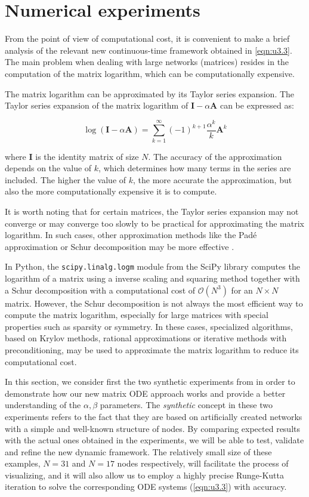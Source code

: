 \chapter{Numerical experiments}
\label{chap:expe}

From the point of view of computational cost, it is convenient to make a brief analysis of the relevant new continuous-time framework obtained in \eqref{eqn:u3.3}. The main problem when dealing with large networks (matrices) resides in the computation of the matrix logarithm, which can be computationally expensive.

The matrix logarithm can be approximated by its Taylor series expansion. The Taylor series expansion of the matrix logarithm of $\mathbf{I} - \alpha \mathbf{A}$ can be expressed as:

$$\log(\mathbf{I} - \alpha \mathbf{A}) = \sum_{k=1}^{\infty} (-1)^{k+1}\frac{\alpha^k}{k}\mathbf{A}^k$$

where $\mathbf{I}$ is the identity matrix of size $N$. The accuracy of the approximation depends on the value of $k$, which determines how many terms in the series are included. The higher the value of $k$, the more accurate the approximation, but also the more computationally expensive it is to compute.

It is worth noting that for certain matrices, the Taylor series expansion may not converge or may converge too slowly to be practical for approximating the matrix logarithm. In such cases, other approximation methods like the Padé approximation or Schur decomposition may be more effective \cite[Ch.\ 11]{higham2008functions}.

In Python, the \texttt{scipy.linalg.logm} module from the SciPy library computes the logarithm of a matrix using a inverse scaling and squaring method together with a Schur decomposition with a computational cost of $\mathcal{O}(N^3)$ for an $N \times N$ matrix. However, the Schur decomposition is not always the most efficient way to compute the matrix logarithm, especially for large matrices with special properties such as sparsity or symmetry. In these cases, specialized algorithms, based on Krylov methods, rational approximations or iterative methods with preconditioning, may be used to approximate the matrix logarithm to reduce its computational cost. 

In this section, we consider first the two synthetic experiments from \cite{grindrod2014dynamical} in order to demonstrate how our new matrix ODE approach works and provide a better understanding of the $\alpha,\beta$ parameters. The \textit{synthetic} concept in these two experiments refers to the fact that they are based on artificially created networks with a simple and well-known structure of nodes. By comparing expected results with the actual ones obtained in the experiments, we will be able to test, validate and refine the new dynamic framework. The relatively small size of these examples, $N=31$ and $N=17$ nodes respectively, will facilitate the process of visualizing, and it will also allow us to employ a highly precise Runge-Kutta iteration to solve the corresponding ODE systems (\ref{eqn:u3.3}) with accuracy.

